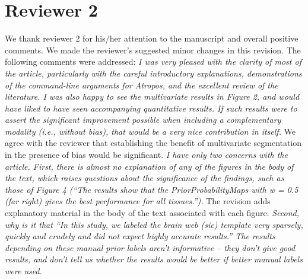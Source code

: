 \documentclass[11pt]{article}
\begin{document}
\section*{Reviewer 2}
We thank reviewer 2 for his/her attention to the manuscript and overall 
positive comments.  We made the reviewer's suggested minor changes in this revision.  
The following comments were addressed: 
\newline
\newline
{\em I was very pleased with the clarity of most of the article,
 particularly with the careful introductory explanations,
 demonstrations of the command-line arguments for Atropos, and the
 excellent review of the literature. I was also happy to see the
 multivariate results in Figure 2, and would have liked to have seen
 accompanying quantitative results. If such results were to assert the
 significant improvement possible when including a complementary
 modality (i.e., without bias), that would be a very nice contribution
 in itself.}
\newline
\newline
We agree with the reviewer that establishing the benefit of
multivariate segmentation in the presence of bias would be
significant.  {\color{black}{Such exploration would probably lengthen
the current manuscript beyond its intended scope.  However, we did 
want to provide suggestive results with the single data set that 
we currently have which will obviously segue into a possible future
publication focusing on multivariate segmentation with Atropos
on specific data sets for which multi-modal data sets are essential.}}
\newline
\newline
{\em I have only two concerns with the article. First, there is almost
  no explanation of any of the figures in the body of the text, which
  raises questions about the significance of the findings, such as
  those of Figure 4 (``The results show that the PriorProbabilityMaps
  with w = 0.5 (far right) gives the best performance for all
  tissues.''). }
\newline
\newline
The revision adds explanatory material in the body of the text
associated with each figure.  {\color{black}{These revisions are printed in blue font and are sprinkled throughout the manuscript.}}
\newline
\newline
{\em Second, why is it that ``In this study, we labeled the brain web (sic) template very sparsely, quickly and crudely and did not expect highly accurate results.''
The results depending on these manual prior labels aren't informative
-- they don't give good results, and don't tell us whether the results
would be better if better manual labels were used.}
\end{document}
